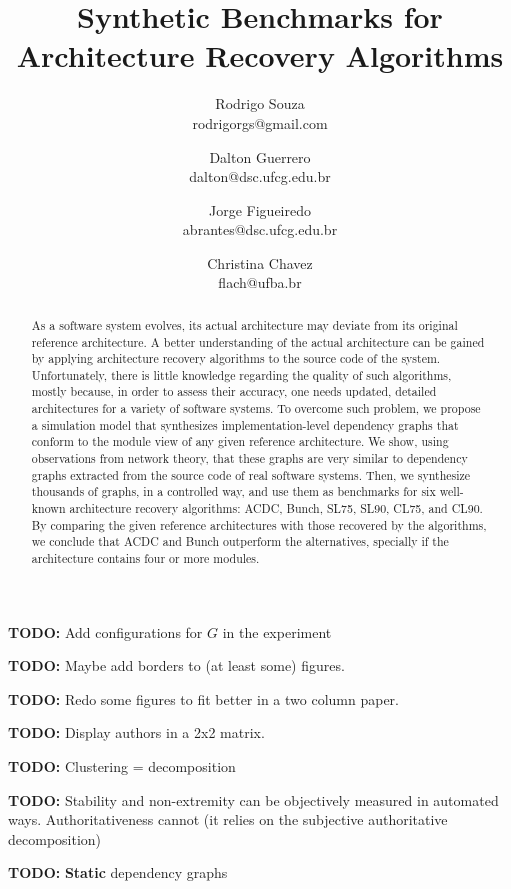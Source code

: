 \documentclass[11pt,twocolumn,a4paper,english]{article}
\title{
Synthetic Benchmarks for Architecture Recovery Algorithms}
\author{Rodrigo Souza \\ rodrigorgs@gmail.com 
\and Dalton Guerrero \\ dalton@dsc.ufcg.edu.br
\and Jorge Figueiredo \\ abrantes@dsc.ufcg.edu.br
\and Christina Chavez \\ flach@ufba.br
}
\newcommand{\TODO}{\textbf{TODO:} }
\begin{document}
	\newcommand{\din}[0]{\ensuremath{\delta_{in}}}
	\newcommand{\dout}[0]{\ensuremath{\delta_{out}}}
	\newcommand{\gin}[0]{\ensuremath{\mathrm{d}_{in}}}
	\newcommand{\gout}[0]{\ensuremath{\mathrm{d}_{out}}}

\sloppy
\maketitle

\tableofcontents
\vspace{1 em}

\TODO Add configurations for $G$ in the experiment

\TODO Maybe add borders to (at least some) figures.

\TODO Redo some figures to fit better in a two column paper.

\TODO Display authors in a 2x2 matrix.

\TODO Clustering = decomposition

\TODO Stability and non-extremity can be objectively measured in automated ways. Authoritativeness cannot (it relies on the subjective authoritative decomposition)

\TODO \textbf{Static} dependency graphs



\begin{abstract}
	As a software system evolves, its actual architecture may deviate from its original reference architecture. A better understanding of the actual architecture can be gained by applying architecture recovery algorithms to the source code of the system. Unfortunately, there is little knowledge regarding the quality of such algorithms, mostly because, in order to assess their accuracy, one needs updated, detailed architectures for a variety of software systems.
	To overcome such problem, we propose a simulation model that synthesizes implementation-level dependency graphs that conform to the module view of any given reference architecture. We show, using observations from network theory, that these graphs are very similar to dependency graphs extracted from the source code of real software systems. 
	Then, we synthesize thousands of graphs, in a controlled way, and use them as benchmarks for six well-known architecture recovery algorithms: ACDC, Bunch, SL75, SL90, CL75, and CL90. By comparing the given reference architectures with those recovered by the algorithms, we conclude that ACDC and Bunch outperform the alternatives, specially if the architecture contains four or more modules.\end{abstract}
\end{document}
